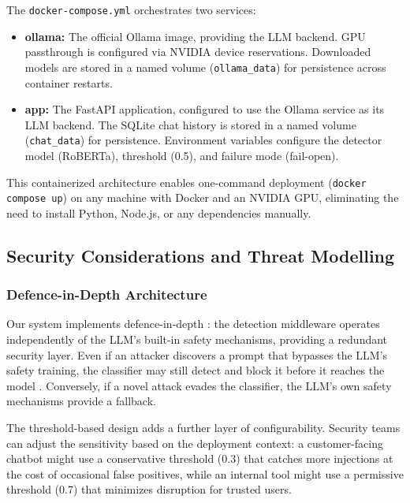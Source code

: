 \documentclass[12pt, letterpaper]{article}   %
\begin{document}
The \texttt{docker-compose.yml} orchestrates two services:

\begin{itemize}
    \item \textbf{ollama:} The official Ollama image, providing the LLM backend. GPU passthrough is configured via NVIDIA device reservations. Downloaded models are stored in a named volume (\texttt{ollama\_data}) for persistence across container restarts.
    \item \textbf{app:} The FastAPI application, configured to use the Ollama service as its LLM backend. The SQLite chat history is stored in a named volume (\texttt{chat\_data}) for persistence. Environment variables configure the detector model (RoBERTa), threshold (0.5), and failure mode (fail-open).
\end{itemize}

This containerized architecture enables one-command deployment (\texttt{docker compose up}) on any machine with Docker and an NVIDIA GPU, eliminating the need to install Python, Node.js, or any dependencies manually.


\subsection{Security Considerations and Threat Modelling}

\subsubsection{Defence-in-Depth Architecture}

Our system implements defence-in-depth \cite{ref38}\cite{ref18}: the detection middleware operates independently of the LLM's built-in safety mechanisms, providing a redundant security layer. Even if an attacker discovers a prompt that bypasses the LLM's safety training, the classifier may still detect and block it before it reaches the model \cite{ref7}. Conversely, if a novel attack evades the classifier, the LLM's own safety mechanisms provide a fallback.

The threshold-based design adds a further layer of configurability. Security teams can adjust the sensitivity based on the deployment context: a customer-facing chatbot might use a conservative threshold (0.3) that catches more injections at the cost of occasional false positives, while an internal tool might use a permissive threshold (0.7) that minimizes disruption for trusted users.
\end{document}

